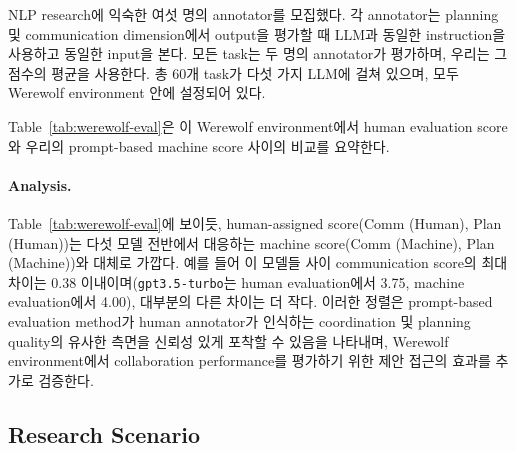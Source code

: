 NLP research에 익숙한 여섯 명의 annotator를 모집했다. 각 annotator는 planning 및 communication dimension에서 output을 평가할 때 LLM과 동일한 instruction을 사용하고 동일한 input을 본다. 모든 task는 두 명의 annotator가 평가하며, 우리는 그 점수의 평균을 사용한다. 총 60개 task가 다섯 가지 LLM에 걸쳐 있으며, 모두 Werewolf environment 안에 설정되어 있다.

Table~\ref{tab:werewolf-eval}은 이 Werewolf environment에서 human evaluation score와 우리의 prompt-based machine score 사이의 비교를 요약한다.


\begin{table}[htbp]
\centering
{}
\caption{Werewolf scenario에서 human evaluation score와 machine evaluation score의 비교.}
\label{tab:werewolf-eval}
\end{table}

\paragraph{Analysis.}
Table~\ref{tab:werewolf-eval}에 보이듯, human-assigned score(Comm (Human), Plan (Human))는 다섯 모델 전반에서 대응하는 machine score(Comm (Machine), Plan (Machine))와 대체로 가깝다. 예를 들어 이 모델들 사이 communication score의 최대 차이는 0.38 이내이며(\texttt{gpt3.5-turbo}는 human evaluation에서 3.75, machine evaluation에서 4.00), 대부분의 다른 차이는 더 작다. 이러한 정렬은 prompt-based evaluation method가 human annotator가 인식하는 coordination 및 planning quality의 유사한 측면을 신뢰성 있게 포착할 수 있음을 나타내며, Werewolf environment에서 collaboration performance를 평가하기 위한 제안 접근의 효과를 추가로 검증한다.


\subsection{Research Scenario}
\label{app:research-scenario}

